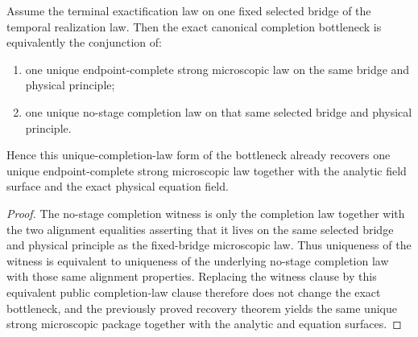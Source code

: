 \begin{theorem}
\label{thm:canonical-completion-bottleneck-iff-canonical-strong-microscopic-law-plus-unique-completion-law}
Assume the terminal exactification law on one fixed selected bridge of the
temporal realization law. Then the exact canonical completion bottleneck is
equivalently the conjunction of:
\begin{enumerate}
\item one unique endpoint-complete strong microscopic law on the same bridge
and physical principle;
\item one unique no-stage completion law on that same selected bridge and
physical principle.
\end{enumerate}
Hence this unique-completion-law form of the bottleneck already recovers one
unique endpoint-complete strong microscopic law together with the analytic
field surface and the exact physical equation field.
\end{theorem}

\begin{proof}
The no-stage completion witness is only the completion law together with the
two alignment equalities asserting that it lives on the same selected bridge
and physical principle as the fixed-bridge microscopic law. Thus uniqueness of
the witness is equivalent to uniqueness of the underlying no-stage completion
law with those same alignment properties. Replacing the witness clause by this
equivalent public completion-law clause therefore does not change the exact
bottleneck, and the previously proved recovery theorem yields the same unique
strong microscopic package together with the analytic and equation surfaces.
\end{proof}

